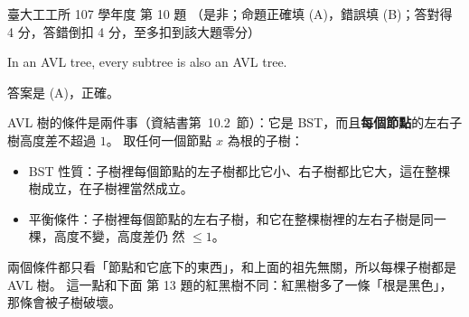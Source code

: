 \begin{pastexam}[label={px:ntu-107-ie-ds-10}]{臺大工工所 107 學年度 第 10 題}
（是非；命題正確填 (A)，錯誤填 (B)；答對得 4 分，答錯倒扣 4 分，至多扣到該大題零分）

In an AVL tree, every subtree is also an AVL tree.
\end{pastexam}

\begin{pastsoln}
答案是 (A)，正確。

AVL 樹的條件是兩件事（資結書第~10.2~節）：它是 BST，而且\textbf{每個節點}的左右子樹高度差不超過
$1$。 取任何一個節點 $x$ 為根的子樹：
\begin{itemize}
\item BST 性質：子樹裡每個節點的左子樹都比它小、右子樹都比它大，這在整棵樹成立，在子樹裡當然成立。
\item 平衡條件：子樹裡每個節點的左右子樹，和它在整棵樹裡的左右子樹是同一棵，高度不變，高度差仍
然 $\le 1$。
\end{itemize}
兩個條件都只看「節點和它底下的東西」，和上面的祖先無關，所以每棵子樹都是 AVL 樹。 這一點和下面
第 13 題的紅黑樹不同：紅黑樹多了一條「根是黑色」，那條會被子樹破壞。
\end{pastsoln}
